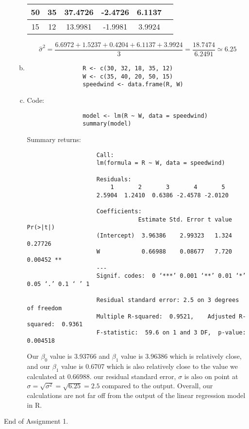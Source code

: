 \documentclass[12pt]{article}
\begin{document}
\begin{enumerate}[1.]
\begin{enumerate}[(a)]
\begin{center}
\begin{tabular}{|c|c|c|c|c|c|}
                    50 & 35 & 37.4726 & -2.4726 & 6.1137 \\
                    \hline
                    15 & 12 & 13.9981 & -1.9981 & 3.9924 \\
                    \hline
                \end{tabular}
                \[ \hat{\sigma}^2 = \frac{6.6972 + 1.5237 + 0.4204 + 6.1137 + 3.9924}{3} = \frac{18.7474}{6.2491} \simeq 6.25 \]
            \end{center}
            \item
            \begin{verbatim}
                R <- c(30, 32, 18, 35, 12)
                W <- c(35, 40, 20, 50, 15)
                speedwind <- data.frame(R, W)
            \end{verbatim}
            \item Code: 
            \begin{verbatim}
                model <- lm(R ~ W, data = speedwind)
                summary(model)
            \end{verbatim}
            
            \begin{center}
                Summary returns:
            \end{center}
            \begin{adjustwidth}{-5cm}{}
                \begin{verbatim}
                    Call:
                    lm(formula = R ~ W, data = speedwind)
                    
                    Residuals:
                        1       2       3       4       5 
                    2.5904  1.2410  0.6386 -2.4578 -2.0120 
                    
                    Coefficients:
                                Estimate Std. Error t value Pr(>|t|)   
                    (Intercept)  3.96386    2.99323   1.324  0.27726   
                    W            0.66988    0.08677   7.720  0.00452 **
                    ---
                    Signif. codes:  0 ‘***’ 0.001 ‘**’ 0.01 ‘*’ 0.05 ‘.’ 0.1 ‘ ’ 1
                    
                    Residual standard error: 2.5 on 3 degrees of freedom
                    Multiple R-squared:  0.9521,	Adjusted R-squared:  0.9361 
                    F-statistic:  59.6 on 1 and 3 DF,  p-value: 0.004518
                \end{verbatim}
            \end{adjustwidth}
                Our $\beta_0$ value is 3.93766 and $\beta_1$ value is 3.96386 which is relatively close, 
                and our $\beta_1$ value is 0.6707 which is also relatively close to the value we calculated at 0.66988.
                our residual standard error, $\sigma$ is also on point at $\sigma = \sqrt{\sigma^2} = \sqrt{6.25} = 2.5$ compared to the output.
                Overall, our calculations are not far off from the output of the linear regression model in R.
        \end{enumerate}
\end{enumerate}
End of Assignment 1.
\end{document}
